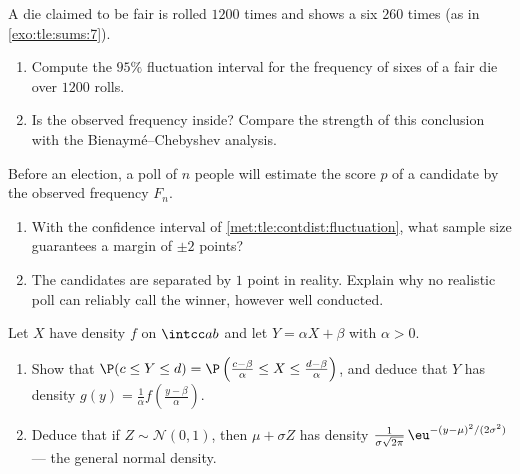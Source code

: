 \begin{exercise}[$\star\star$]\label{exo:tle:contdist:7}
A die claimed to be fair is rolled $1200$ times and shows a six $260$
times (as in \cref{exo:tle:sums:7}).
\begin{enumerate}
  \item Compute the $95\%$ fluctuation interval for the frequency of sixes
        of a fair die over $1200$ rolls.
  \item Is the observed frequency inside? Compare the strength of this
        conclusion with the Bienaymé--Chebyshev analysis.
\end{enumerate}
\end{exercise}

\begin{exercise}[$\star\star\star$]\label{exo:tle:contdist:8}
Before an election, a poll of $n$ people will estimate the score $p$ of a
candidate by the observed frequency $F_n$.
\begin{enumerate}
  \item With the confidence interval of
        \cref{met:tle:contdist:fluctuation}, what sample size guarantees a
        margin of $\pm 2$ points?
  \item The candidates are separated by $1$ point in reality. Explain why
        no realistic poll can reliably call the winner, however well
        conducted.
\end{enumerate}
\end{exercise}

\begin{exercise}[$\star\star\star$]\label{exo:tle:contdist:9}
Let $X$ have density $f$ on $\intcc ab$ and let
$Y = \alpha X + \beta$ with $\alpha > 0$.
\begin{enumerate}
  \item Show that $\P(c \leq Y \leq d)
        = \P\left(\frac{c - \beta}{\alpha} \leq X \leq
        \frac{d-\beta}{\alpha}\right)$, and deduce that $Y$ has density
        $g(y) = \frac{1}{\alpha} f\left(\frac{y - \beta}{\alpha}\right)$.
  \item Deduce that if $Z \sim \mathcal N(0,1)$, then
        $\mu + \sigma Z$ has density
        $\frac{1}{\sigma\sqrt{2\pi}}\,
        \eu^{-(y - \mu)^2/(2\sigma^2)}$ --- the general normal density.
\end{enumerate}
\end{exercise}
